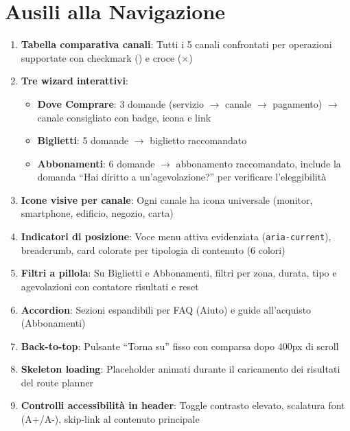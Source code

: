 ﻿\documentclass[11pt,a4paper]{article}
\begin{document}
\section{Ausili alla Navigazione}

\begin{tcolorbox}[rffield]
\small
\begin{enumerate}[nosep,leftmargin=*]
  \item \textbf{Tabella comparativa canali}: Tutti i 5 canali confrontati per operazioni supportate con checkmark (\checkmark) e croce ($\times$)
  \item \textbf{Tre wizard interattivi}: 
    \begin{itemize}[nosep]
      \item \textbf{Dove Comprare}: 3 domande (servizio $\rightarrow$ canale $\rightarrow$ pagamento) $\rightarrow$ canale consigliato con badge, icona e link
      \item \textbf{Biglietti}: 5 domande $\rightarrow$ biglietto raccomandato
      \item \textbf{Abbonamenti}: 6 domande $\rightarrow$ abbonamento raccomandato, include la domanda ``Hai diritto a un'agevolazione?'' per verificare l'eleggibilit\`a
    \end{itemize}
  \item \textbf{Icone visive per canale}: Ogni canale ha icona universale (monitor, smartphone, edificio, negozio, carta)
  \item \textbf{Indicatori di posizione}: Voce menu attiva evidenziata (\texttt{aria-current}), breadcrumb, card colorate per tipologia di contenuto (6 colori)
  \item \textbf{Filtri a pillola}: Su Biglietti e Abbonamenti, filtri per zona, durata, tipo e agevolazioni con contatore risultati e reset
  \item \textbf{Accordion}: Sezioni espandibili per FAQ (Aiuto) e guide all'acquisto (Abbonamenti)
  \item \textbf{Back-to-top}: Pulsante ``Torna su'' fisso con comparsa dopo 400px di scroll
  \item \textbf{Skeleton loading}: Placeholder animati durante il caricamento dei risultati del route planner
  \item \textbf{Controlli accessibilit\`a in header}: Toggle contrasto elevato, scalatura font (A+/A-), skip-link al contenuto principale

\end{enumerate}
\end{tcolorbox}
\end{document}
